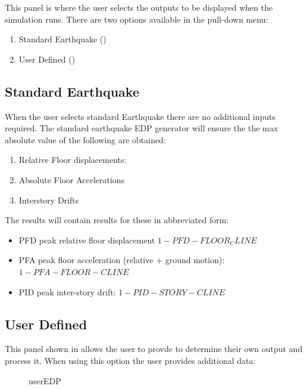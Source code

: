 This panel is where the user selects the outputs to be displayed when
the simulation runs. There are two options available in the pull-down
menu:
\begin{enumerate}
\item Standard Earthquake ()
\item User Defined ()
\end{enumerate}

\subsection{Standard Earthquake}\label{subsec:sectionStandardEarthquake}
When the user selects standard Earthquake there are no additional
inputs required. The standard earthquake EDP generator will ensure the
the max absolute value of the following are obtained:
\begin{enumerate}
\item Relative Floor displacements:
\item Absolute Floor Accelerations
\item Interstory Drifts
\end{enumerate}

The results will contain results for these in abbreviated form:
\begin{itemize}
\item PFD peak relative floor displacement $1-PFD-FLOOR_CLINE$
\item PFA peak floor acceleration (relative + ground motion):
  $1-PFA-FLOOR-CLINE$
\item PID peak inter-story drift: $1-PID-STORY-CLINE$
\end{itemize}

\subsection{User Defined}\label{subsec:sectionUserDefined}
This panel shown in  allows the user to provde to determine their own output and process it. When using this option the user provides additional data:

\begin{figure}[!htbp]
  \caption{userEDP}
  \label{fig:userEDP}
\end{figure}

